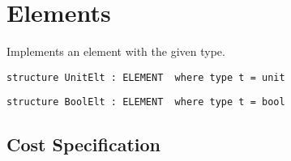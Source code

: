 \chapter{Elements}
\label{ch:elt-structures}

\begin{preamble}
Implements an element with the given type.

\begin{verbatim}
structure UnitElt : ELEMENT  where type t = unit
\end{verbatim}

\begin{verbatim}
structure BoolElt : ELEMENT  where type t = bool
\end{verbatim}

\end{preamble}

\section{Cost Specification}









